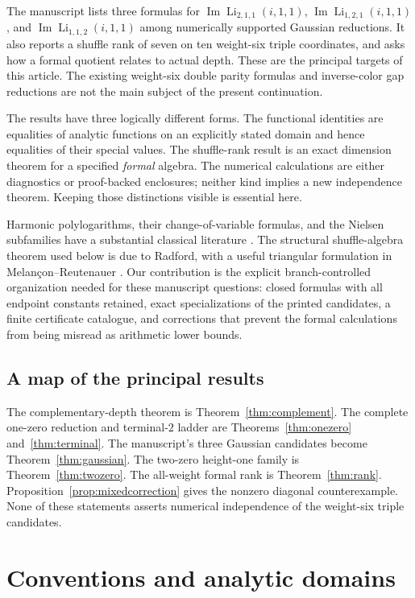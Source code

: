 \documentclass[11pt]{article}
\numberwithin{equation}{section}
\theoremstyle{definition}\newtheorem{definition}[theorem]{Definition}
\theoremstyle{remark}\newtheorem{remark}[theorem]{Remark}
\DeclareMathOperator{\Li}{Li}
\DeclareMathOperator{\Ima}{Im}
\begin{document}
The manuscript lists three formulas for
$\Ima\Li_{2,1,1}(i,1,1)$,
$\Ima\Li_{1,2,1}(i,1,1)$, and
$\Ima\Li_{1,1,2}(i,1,1)$ among numerically supported Gaussian reductions.
It also reports a shuffle rank of seven on ten weight-six triple
coordinates, and asks how a formal quotient relates to actual depth.
These are the principal targets of this article. The existing
weight-six double parity formulas and inverse-color gap reductions are
not the main subject of the present continuation.

The results have three logically different forms. The functional
identities are equalities of analytic functions on an explicitly stated
domain and hence equalities of their special values. The shuffle-rank
result is an exact dimension theorem for a specified \emph{formal}
algebra. The numerical calculations are either diagnostics or
proof-backed enclosures; neither kind implies a new independence theorem.
Keeping those distinctions visible is essential here.

Harmonic polylogarithms, their change-of-variable formulas, and the
Nielsen subfamilies have a substantial classical literature
\cite{RemiddiVermaseren,Kolbig}. The structural shuffle-algebra theorem
used below is due to Radford, with a useful triangular formulation in
Melan\c{c}on--Reutenauer \cite{Radford,MelanconReutenauer}.
Our contribution is the explicit branch-controlled organization needed
for these manuscript questions: closed formulas with all endpoint
constants retained, exact specializations of the printed candidates,
a finite certificate catalogue, and corrections that prevent the formal
calculations from being misread as arithmetic lower bounds.

\subsection{A map of the principal results}
The complementary-depth theorem is Theorem~\ref{thm:complement}.
The complete one-zero reduction and terminal-$2$ ladder are
Theorems~\ref{thm:onezero} and~\ref{thm:terminal}.
The manuscript's three Gaussian candidates become
Theorem~\ref{thm:gaussian}. The two-zero height-one family is
Theorem~\ref{thm:twozero}. The all-weight formal rank is
Theorem~\ref{thm:rank}. Proposition~\ref{prop:mixedcorrection} gives the
nonzero diagonal counterexample. None of these statements asserts
numerical independence of the weight-six triple candidates.

\section{Conventions and analytic domains}
\end{document}
